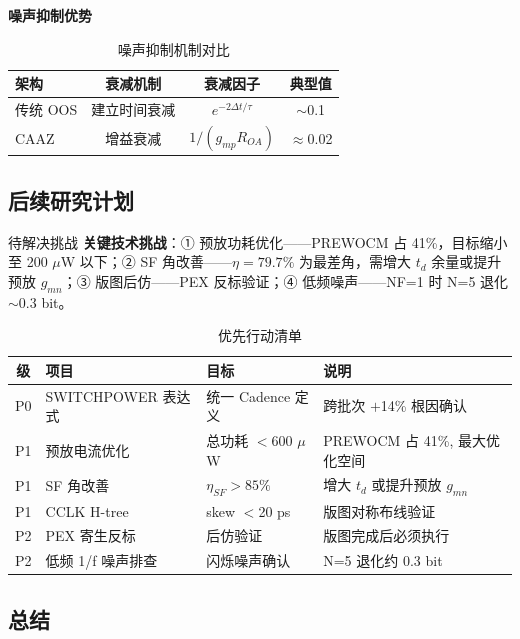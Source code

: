 \documentclass[11pt,a4paper,UTF8]{ctexart}
\begin{document}
\textbf{噪声抑制优势}

\begin{table}[htbp]\centering\caption{噪声抑制机制对比}\label{tab:noise-adv}\small
\begin{tabular}{lccc}\toprule
\textbf{架构} & \textbf{衰减机制} & \textbf{衰减因子} & \textbf{典型值} \\\midrule
传统 OOS & 建立时间衰减 & $e^{-2\Delta t/\tau}$ & $\sim$0.1 \\
CAAZ & 增益衰减 & $1/(g_{mp}R_{OA})$ & $\approx$0.02 \\\bottomrule
\end{tabular}
\end{table}

\subsection{后续研究计划}

\begin{warnbox}{待解决挑战}
\textbf{关键技术挑战}：① 预放功耗优化——PREWOCM 占 41\%，目标缩小至 200 $\mu$W 以下；② SF 角改善——$\eta=79.7\%$ 为最差角，需增大 $t_d$ 余量或提升预放 $g_{mn}$；③ 版图后仿——PEX 反标验证；④ 低频噪声——NF=1 时 N=5 退化 $\sim$0.3 bit。
\end{warnbox}

\begin{table}[htbp]\centering\caption{优先行动清单}\label{tab:actions}\small\setlength{\tabcolsep}{6pt}
\begin{tabular}{c>{\raggedright}p{3cm}>{\raggedright}p{3.5cm}>{\raggedright}p{5.5cm}}\toprule
\textbf{级} & \textbf{项目} & \textbf{目标} & \textbf{说明} \\\midrule
P0 & SWITCHPOWER 表达式 & 统一 Cadence 定义 & 跨批次 $+$14\% 根因确认 \\
P1 & 预放电流优化 & 总功耗 $<$600 $\mu$W & PREWOCM 占 41\%, 最大优化空间 \\
P1 & SF 角改善 & $\eta_{SF}>85\%$ & 增大 $t_d$ 或提升预放 $g_{mn}$ \\
P1 & CCLK H-tree & skew $<$20 ps & 版图对称布线验证 \\
P2 & PEX 寄生反标 & 后仿验证 & 版图完成后必须执行 \\
P2 & 低频 1/f 噪声排查 & 闪烁噪声确认 & N=5 退化约 0.3 bit \\\bottomrule
\end{tabular}
\end{table}

\subsection{总结}
\end{document}
